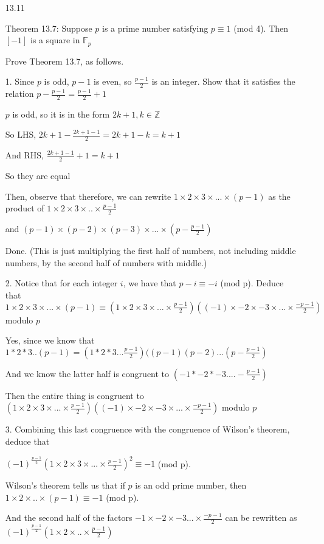\documentclass[12pt]{article}
\begin{document}
\begin{itemize}
\newpage
\item[13.11]

	Theorem 13.7: Suppose $p$ is a prime number satisfying $p \equiv 1$ (mod 4). Then $[-1]$ is a square in $\mathbb{F}_p$

	Prove Theorem 13.7, as follows.

	1. Since $p$ is odd, $p-1$ is even, so $\frac{p-1}{2}$ is an integer. Show that it satisfies the relation $p-\frac{p-1}{2} = \frac{p-1}{2} + 1$

	$p$ is odd, so it is in the form $2k+1, k\in\mathbb{Z}$

	So LHS, $2k+1 - \frac{2k+1-1}{2} = 2k + 1- k = k + 1$

	And RHS, $\frac{2k+1-1}{2} + 1 = k + 1$

	So they are equal

Then, observe that therefore, we can rewrite $1 \times 2 \times 3 \times ... \times (p-1)$ as the product of $1 \times 2 \times 3 \times .. \times \frac{p-1}{2}$

and $(p-1)\times (p-2) \times (p-3) \times ... \times (p -\frac{p-1}{2})$

	Done. (This is just multiplying the first half of numbers, not including middle numbers, by the second half of numbers with middle.)

	2. Notice that for each integer $i$, we have that $p-i \equiv -i$ (mod p). Deduce that $1 \times 2 \times 3 \times ... \times (p-1) \equiv (1 \times 2 \times 3 \times ... \times \frac{p-1}{2})((-1) \times -2 \times -3 \times ... \times \frac{-p-1}{2})$ modulo $p$

	Yes, since we know that $1*2*3.. (p-1) = (1*2*3...\frac{p-1}{2})((p-1)(p-2)...(p - \frac{p-1}{2})$

	And we know the latter half is congruent to $(-1*-2*-3....-\frac{p-1}{2})$

	Then the entire thing is congruent to $(1 \times 2 \times 3 \times ... \times \frac{p-1}{2})((-1) \times -2 \times -3 \times ... \times \frac{-p-1}{2})$ modulo $p$

	3. Combining this last congruence with the congruence of Wilson's theorem, deduce that 

	$(-1)^{\frac{p-1}{2}} (1 \times 2 \times 3 \times ... \times \frac{p-1}{2})^2 \equiv -1$ (mod p).

	Wilson's theorem tells us that if $p$ is an odd prime number, then $1 \times 2 \times .. \times (p-1) \equiv -1$ (mod p).

	And the second half of the factors $-1 \times -2 \times -3 ... \times \frac{-p-1}{2}$ can be rewritten as $(-1)^{\frac{p-1}{2}} (1 \times 2 \times .. \times \frac{p-1}{2})$


\end{itemize}
\end{document}
